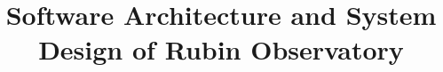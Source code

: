 \documentclass[11pt,twoside]{article}
\begin{document}


\title{Software Architecture and System Design of Rubin Observatory}



\end{document}
